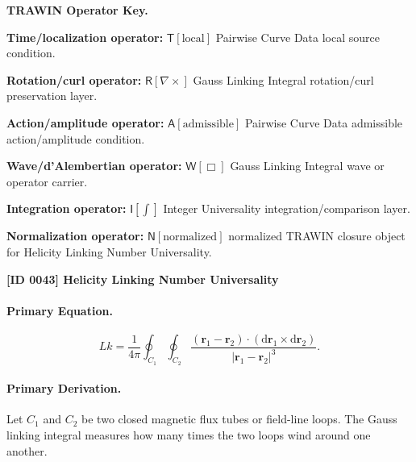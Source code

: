 \par\vspace{0.45\baselineskip}
\noindent\begin{minipage}[t]{\linewidth}
\begingroup
\small
\raggedright
\textbf{TRAWIN Operator Key.}\par
\noindent\textbf{Time/localization operator:} $\mathsf{T}\!\left[\mathrm{local}\right]$ Pairwise Curve Data local source condition.\par
\noindent\textbf{Rotation/curl operator:} $\mathsf{R}\!\left[\nabla\times\right]$ Gauss Linking Integral rotation/curl preservation layer.\par
\noindent\textbf{Action/amplitude operator:} $\mathsf{A}\!\left[\mathrm{admissible}\right]$ Pairwise Curve Data admissible action/amplitude condition.\par
\noindent\textbf{Wave/d'Alembertian operator:} $\mathsf{W}\!\left[\Box\right]$ Gauss Linking Integral wave or operator carrier.\par
\noindent\textbf{Integration operator:} $\mathsf{I}\!\left[\int\right]$ Integer Universality integration/comparison layer.\par
\noindent\textbf{Normalization operator:} $\mathsf{N}\!\left[\mathrm{normalized}\right]$ normalized TRAWIN closure object for Helicity Linking Number Universality.\par
\endgroup
\end{minipage}

\clearpage
\noindent\textbf{[ID 0043] Helicity Linking Number Universality}\par
\vspace{0.35em}
\paragraph{Primary Equation.}
\begin{equation}
Lk
=
\frac{1}{4\pi}
\oint_{C_1}
\oint_{C_2}
\frac{
(\mathbf{r}_1-\mathbf{r}_2)
\cdot
(\mathrm{d}\mathbf{r}_1\times \mathrm{d}\mathbf{r}_2)
}{
|\mathbf{r}_1-\mathbf{r}_2|^3
}.
\end{equation}

\paragraph{Primary Derivation.}
Let $C_1$ and $C_2$ be two closed magnetic flux tubes or field-line loops.  
The Gauss linking integral measures how many times the two loops wind around one another.


